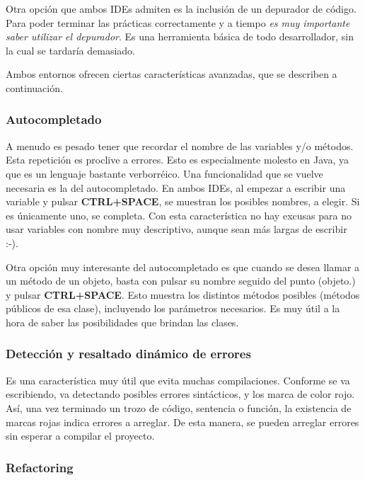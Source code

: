 \documentclass[11pt]{article}
\begin{document}
Otra opción que ambos IDEs admiten es la inclusión de un depurador de código.
Para poder terminar las prácticas correctamente y a tiempo \emph{es muy
importante saber utilizar el depurador}. Es una herramienta básica de todo
desarrollador, sin la cual se tardaría demasiado.

Ambos entornos ofrecen ciertas características avanzadas, que se describen a
continuación.

\subsubsection{Autocompletado} \label{sec-3-2-1}

A menudo es pesado tener que recordar el nombre de las variables y/o métodos.
Esta repetición es proclive a errores. Esto es especialmente molesto en Java, ya
que es un lenguaje bastante verborréico. Una funcionalidad que se vuelve
necesaria es la del autocompletado. En ambos IDEs, al empezar a escribir una
variable y pulsar \textbf{CTRL+SPACE}, se muestran los posibles nombres, a
elegir. Si es únicamente uno, se completa. Con esta característica no hay
excusas para no usar variables con nombre muy descriptivo, aunque sean más
largas de escribir :-).

Otra opción muy interesante del autocompletado es que cuando se desea llamar a
un método de un objeto, basta con pulsar su nombre seguido del punto
(\textsf{objeto.}) y pulsar \textbf{CTRL+SPACE}. Esto muestra los distintos
métodos posibles (métodos públicos de esa clase), incluyendo los parámetros
necesarios. Es muy útil a la hora de saber las posibilidades que brindan las
clases.

\subsubsection{Detección y resaltado dinámico de errores} \label{sec-3-2-2}

Es una característica muy útil que evita muchas compilaciones. Conforme se va
escribiendo, va detectando posibles errores sintácticos, y los marca de color
rojo. Así, una vez terminado un trozo de código, sentencia o función, la
existencia de marcas rojas indica errores a arreglar. De esta manera, se pueden
arreglar errores sin esperar a compilar el proyecto.


\subsubsection{Refactoring} \label{sec-3-2-3}
\end{document}
